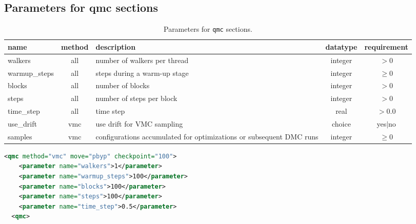 \subsection{Parameters for qmc sections}\label{common.sec}

\begin{table}[h]
\begin{center}
\begin{tabular}{l c p{} c c }
\hline
\bfseries name & \bfseries method& \bfseries description & \bfseries datatype & \bfseries requirement \\
\hline
 walkers & all & number of walkers per thread & integer& $> 0$ \\
warmup\_steps & all & steps during a warm-up stage& integer& $\geq 0$ \\
blocks & all& number of blocks  & integer& $> 0$ \\
steps& all& number of steps per block & integer&  $> 0$ \\
time\_step& all & time step & real& $> 0.0$ \\
use\_drift& vmc & use drift for VMC sampling & choice& yes$|$no \\
samples& vmc & configurations accumulated for optimizations or subsequent DMC runs & integer& $\geq 0$ \\
\hline
\end{tabular}
\end{center}
\caption{Parameters for \texttt{qmc} sections. }
\label{req.packages}
\end{table}


\begin{lstlisting}[language=xml,
emph={qmc,parameter},emphstyle=\bfseries\color{blue}]
  <qmc method="vmc" move="pbyp" checkpoint="100">
    <parameter name="walkers">1</parameter>
    <parameter name="warmup_steps">100</parameter>
    <parameter name="blocks">100</parameter>
    <parameter name="steps">100</parameter>
    <parameter name="time_step">0.5</parameter>
  <qmc>
\end{lstlisting}

